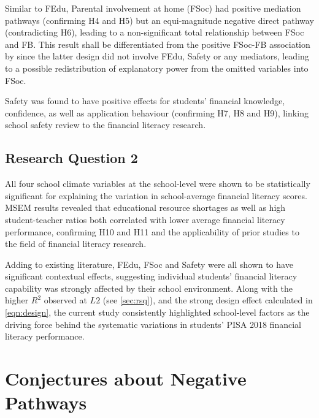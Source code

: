 \documentclass[a4paper,11pt,UKenglish,twoside,openright]{report}\usepackage[]{graphicx}\usepackage[]{color}
\begin{document}
Similar to FEdu, Parental involvement at home (FSoc) had positive mediation pathways (confirming H4 and H5) but an equi-magnitude negative direct pathway (contradicting H6), leading to a non-significant total relationship between FSoc and FB. This result shall be differentiated from the positive FSoc-FB association by \textcite{morenoherrero:2018a} since the latter design did not involve FEdu, Safety or any mediators, leading to a possible redistribution of explanatory power from the omitted variables into FSoc.

Safety was found to have positive effects for students' financial knowledge, confidence, as well as application behaviour (confirming H7, H8 and H9), linking  school safety review to the financial literacy research.

\subsection{Research Question 2}

All four school climate variables at the school-level were shown to be statistically significant for explaining the variation in school-average financial literacy scores. MSEM results revealed that educational resource shortages as well as high student-teacher ratios both correlated with lower average financial literacy performance, confirming H10 and H11 and the applicability of prior studies \parencite{finn:1999, miles:1998, uline:2008} to the field of financial literacy research.

Adding to existing literature, FEdu, FSoc and Safety were all shown to have significant contextual effects, suggesting individual students' financial literacy capability was strongly affected by their school environment. Along with the higher $R^2$ observed at $L2$ (see \cref{sec:rsq}), and the strong design effect calculated in \cref{eqn:design}, the current study consistently highlighted school-level factors as the driving force behind the systematic variations in students' PISA 2018 financial literacy performance.

\section{Conjectures about Negative Pathways}\label{sec:conj}
\end{document}
